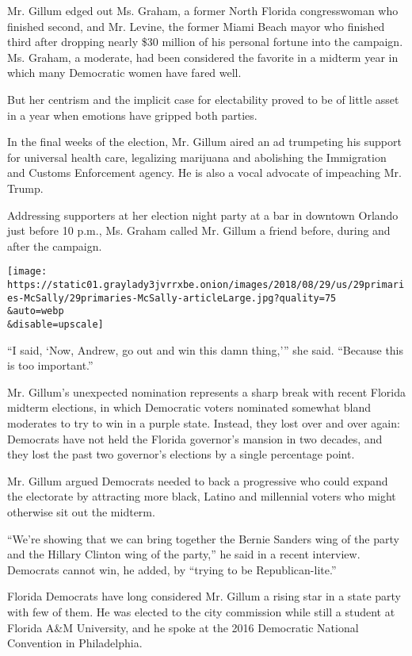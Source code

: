 Mr. Gillum edged out Ms. Graham, a former North Florida congresswoman
who finished second, and Mr. Levine, the former Miami Beach mayor who
finished third after dropping nearly \$30 million of his personal
fortune into the campaign. Ms. Graham, a moderate, had been considered
the favorite in a midterm year in which many Democratic women have fared
well.

But her centrism and the implicit case for electability proved to be of
little asset in a year when emotions have gripped both parties.

In the final weeks of the election, Mr. Gillum aired an ad trumpeting
his support for universal health care, legalizing marijuana and
abolishing the Immigration and Customs Enforcement agency. He is also a
vocal advocate of impeaching Mr. Trump.

Addressing supporters at her election night party at a bar in downtown
Orlando just before 10 p.m., Ms. Graham called Mr. Gillum a friend
before, during and after the campaign.

\texttt{[image: https://static01.graylady3jvrrxbe.onion/images/2018/08/29/us/29primaries-McSally/29primaries-McSally-articleLarge.jpg?quality=75\\\&auto=webp\\\&disable=upscale]}

``I said, `Now, Andrew, go out and win this damn thing,''' she said.
``Because this is too important.''

Mr. Gillum's unexpected nomination represents a sharp break with recent
Florida midterm elections, in which Democratic voters nominated somewhat
bland moderates to try to win in a purple state. Instead, they lost over
and over again: Democrats have not held the Florida governor's mansion
in two decades, and they lost the past two governor's elections by a
single percentage point.

Mr. Gillum argued Democrats needed to back a progressive who could
expand the electorate by attracting more black, Latino and millennial
voters who might otherwise sit out the midterm.

``We're showing that we can bring together the Bernie Sanders wing of
the party and the Hillary Clinton wing of the party,'' he said in a
recent interview. Democrats cannot win, he added, by ``trying to be
Republican-lite.''

Florida Democrats have long considered Mr. Gillum a rising star in a
state party with few of them. He was elected to the city commission
while still a student at Florida A\&M University, and he spoke at the
2016 Democratic National Convention in Philadelphia.


